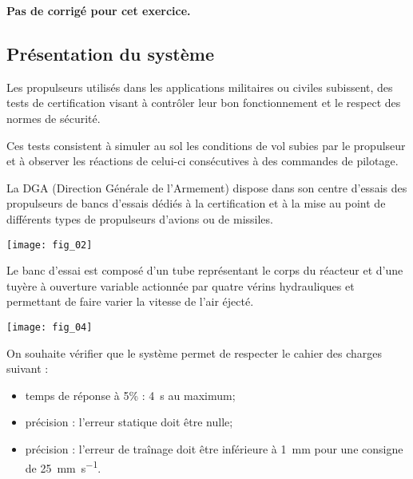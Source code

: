 \normaltrue \difficilefalse \tdifficilefalse
\correctionfalse




\setcounter{numques}{0}
\ifcorrection
\else
\textbf{Pas de corrigé pour cet exercice.}
\fi


\subsection*{Présentation du système}
\ifprof
\else
Les propulseurs utilisés dans les applications militaires ou civiles subissent, des tests de certification
visant à contrôler leur bon fonctionnement et le respect des normes de sécurité.

Ces tests consistent à simuler au sol les conditions de vol subies par le propulseur et à observer les réactions de celui-ci
consécutives à des commandes de pilotage. 

La DGA (Direction Générale de l'Armement) dispose dans son centre d'essais des propulseurs de bancs d'essais
dédiés à la certification et à la mise au point de différents types de propulseurs d'avions ou de missiles.

\begin{center}
\texttt{[image: fig\_02]}
\end{center}

Le banc d'essai est composé d'un tube représentant le corps du réacteur et d'une tuyère à ouverture variable
actionnée par quatre vérins hydrauliques et permettant de faire varier la vitesse de l'air éjecté. 


\begin{center}
\texttt{[image: fig\_04]}
\end{center}

\fi

\begin{obj}
On souhaite vérifier que le système permet de respecter le cahier des charges suivant : 
\begin{itemize}
\item temps de réponse à 5\% : \SI{4}{s} au maximum;
\item précision : l'erreur statique doit être nulle;
\item précision : l'erreur de traînage doit être inférieure à \SI{1}{mm} pour une consigne de \SI{25}{mm.s^{-1}}.
\end{itemize}
\end{obj}


